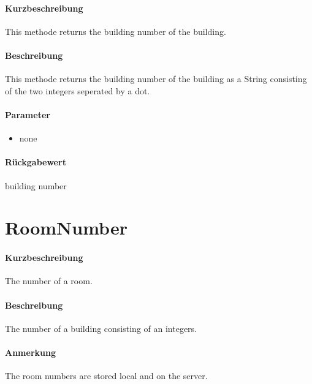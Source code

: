 \paragraph*{Kurzbeschreibung}
This methode returns the building number of the building.
\paragraph*{Beschreibung}
This methode returns the building number of the building as a String consisting of the two integers seperated by a dot.
\paragraph*{Parameter}
\begin{itemize}
    \item none
\end{itemize}
\paragraph*{Rückgabewert}
building number

\section{RoomNumber}
\paragraph*{Kurzbeschreibung}
The number of a room.
\paragraph*{Beschreibung}
The number of a building consisting of an integers.
\paragraph*{Anmerkung}
The room numbers are stored local and on the server.